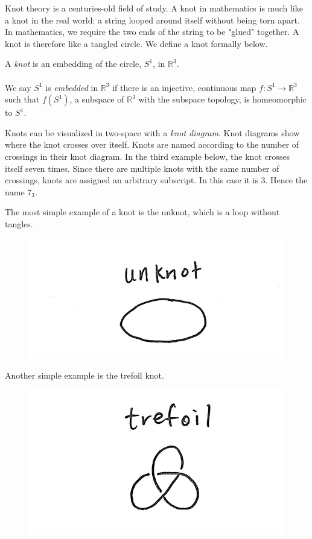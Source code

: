 Knot theory is a centuries-old field of study. A knot in mathematics is much like a knot in the real world: a string looped around itself without being torn apart. In mathematics, we require the two ends of the string to be "glued" together. A knot is therefore like a tangled circle. We define a knot formally below.
\begin{definition}[Knot]
A \emph{knot} is an embedding of the circle, $S^1$, in $\mathbb{R}^3$.\\\\
We say $S^1$ is \emph{embedded} in $\mathbb{R}^3$ if there is an injective, continuous map $f:S^1 \rightarrow \mathbb{R}^3$ such that $f(S^1)$, a subspace of $\mathbb{R}^3$ with the subspace topology, is homeomorphic to $S^1$.
\end{definition}

\begin{remark}
Knots can be visualized in two-space with a \emph{knot diagram}. Knot diagrams show where the knot crosses over itself. Knots are named according to the number of crossings in their knot diagram. In the third example below, the knot crosses itself seven times. Since there are multiple knots with the same number of crossings, knots are assigned an arbitrary subscript. In this case it is 3. Hence the name $7_{3}$.
\end{remark}

The most simple example of a knot is the unknot, which is a loop without tangles.
\begin{figure}[H]
\centering
\includegraphics[scale=0.2]{figures/unknot.jpg}
\end{figure}

Another simple example is the trefoil knot.
\begin{figure}[H]
\centering
\includegraphics[scale=0.2]{figures/trefoil.jpg}
\end{figure}

